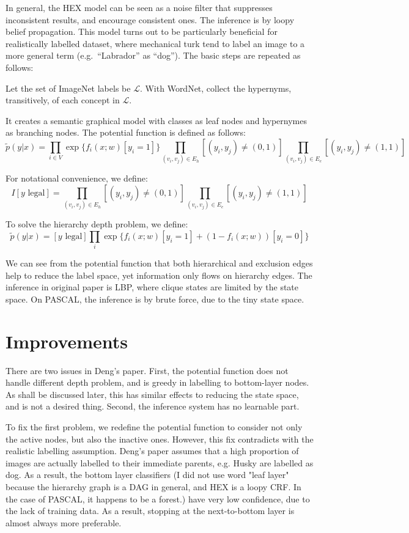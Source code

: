 \documentclass[11pt,a4paper]{article}
\begin{document}
In general, the HEX model can be seen as a noise filter that suppresses inconsistent results, and encourage consistent ones. The inference is by loopy belief propagation. This model turns out to be particularly beneficial for realistically labelled dataset, where mechanical turk tend to label an image to a more general term (e.g.\ ``Labrador'' as ``dog''). The basic steps are repeated as follows:

Let the set of ImageNet labels be $\mathcal{L}$. With WordNet, collect the hypernyms, transitively, of each concept in $\mathcal{L}$. 

It creates a semantic graphical model with classes as leaf nodes and hypernymes as branching nodes. The potential function is defined as follows:
\[\tilde{p}(y|x)=\prod_{i\in V}\exp\{f_i(x;w)[y_i=1]\}\prod_{(v_i,v_j)\in E_h}[(y_i,y_j)\neq(0,1)]\prod_{(v_i,v_j)\in E_e}[(y_i,y_j)\neq(1,1)]\]

For notational convenience, we define:
\[I[y\text{ legal}]=\prod_{(v_i,v_j)\in E_h}[(y_i,y_j)\neq(0,1)]\prod_{(v_i,v_j)\in E_e}[(y_i,y_j)\neq(1,1)]\]

To solve the hierarchy depth problem, we define:
\[\tilde{p}(y|x)=[y\text{ legal}]\prod_i\exp\{f_i(x;w)[y_i=1]+(1-f_i(x;w))[y_i=0]\}\]

We can see from the potential function that both hierarchical and exclusion edges help to reduce the label space, yet information only flows on hierarchy edges. The inference in original paper is LBP, where clique states are limited by the state space. On PASCAL, the inference is by brute force, due to the tiny state space.

\section{Improvements}

There are two issues in Deng's paper. First, the potential function does not handle different depth problem, and is greedy in labelling to bottom-layer nodes. As shall be discussed later, this has similar effects to reducing the state space, and is not a desired thing. Second, the inference system has no learnable part.

To fix the first problem, we redefine the potential function to consider not only the active nodes, but also the inactive ones. However, this fix contradicts with the realistic labelling assumption. Deng's paper assumes that a high proportion of images are actually labelled to their immediate parents, e.g. Husky are labelled as dog. As a result, the bottom layer classifiers (I did not use word "leaf layer" because the hierarchy graph is a DAG in general, and HEX is a loopy CRF. In the case of PASCAL, it happens to be a forest.) have very low confidence, due to the lack of training data. As a result, stopping at the next-to-bottom layer is almost always more preferable.
\end{document}
